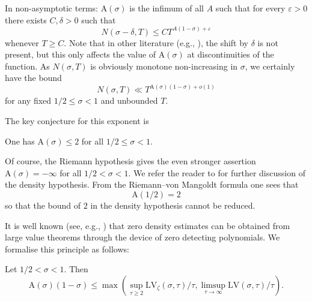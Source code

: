 \documentclass[a4paper, 10pt]{amsart}
\newcommand{\eps}{\varepsilon}
\newcommand{\LV}{\mathrm{LV}}
\newcommand{\A}{\mathrm{A}}
\begin{document}
In non-asymptotic terms: $\A(\sigma)$ is the infimum of all $A$ such that for every $\eps>0$ there exists $C, \delta > 0$ such that
$$ N(\sigma-\delta, T) \leq C T^{A(1-\sigma)+\eps}$$
whenever $T \geq C$.  Note that in other literature (e.g., \cite{ivic}), the shift by $\delta$ is not present, but this only affects the value of $\A(\sigma)$ at discontinuities of the function.  As $N(\sigma,T)$ is obviously monotone non-increasing in $\sigma$, we certainly have the bound
$$ N(\sigma,T) \ll T^{\A(\sigma)(1-\sigma)+o(1)}$$
for any fixed $1/2 \leq \sigma < 1$ and unbounded $T$.

The key conjecture for this exponent is

\begin{conjecture}\label{density-hypothesis}  One has $\A(\sigma) \leq 2$ for all $1/2 \leq \sigma < 1$.
\end{conjecture}

Of course, the Riemann hypothesis gives the even stronger assertion $\A(\sigma)=-\infty$ for all $1/2 < \sigma < 1$. We refer the reader to \cite[Chapter 9]{titchmarsh_theory_1986} for further discussion of the density hypothesis.  From the Riemann--von Mangoldt formula one sees that
\begin{equation}\label{adens}
    \A(1/2) = 2
\end{equation}
so that the bound of $2$ in the density hypothesis cannot be reduced.

It is well known (see, e.g., \cite[Chapter 10]{ik}) that zero density estimates can be obtained from large value theorems through the device of zero detecting polynomials.  We formalise this principle as follows:

\begin{lemma}\label{zero-from-large}  Let $1/2 < \sigma < 1$.  Then
    $$ \A(\sigma)(1-\sigma) \leq \max( \sup_{\tau \geq 2} \LV_\zeta(\sigma,\tau)/\tau, \limsup_{\tau \to \infty} \LV(\sigma,\tau)/\tau ).$$
    \end{lemma}
\end{document}
